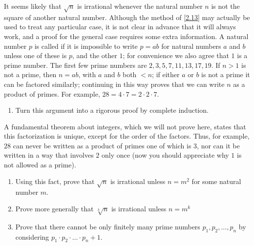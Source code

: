 \begin{pr}[*] \label{2.17} %
  It seems likely that $\sqrt{n}$ is irrational whenever
  the natural number $n$ is not the square of another
  natural number. Although the method of \autoref{2.13}
  may actually be used to treat any particular case, it is
  not clear in advance that it will always work, and a proof
  for the general case requires some extra information.
  A natural number $p$ is called  if
  it is impossible to write $p = ab$ for natural numbers
  $a$ and $b$ unless one of these is $p$, and the other $1$;
  for convenience we also agree that $1$ is 
  a prime number. The first few prime numbers are
  $2,3,5,7,11,13,17,19$. If $n > 1$ is not a prime, then
  $n = ab$, with $a$ and $b$ both $< n$; if either $a$ or
  $b$ is not a prime it can be factored similarly; continuing
  in this way proves that we can write $n$ as a product of
  primes. For example, $28 = 4 \cdot 7 = 2\cdot2\cdot7$.
  \begin{enumerate}[label=(\alph*)]
    \item \label{2.17:a}
    Turn this argument into a rigorous proof by
    complete induction.
  \end{enumerate}
  A fundamental theorem about integers, which we will not
  prove here, states that this factorization is unique,
  except for the order of the factors. Thus, for example,
  $28$ can never be written as a product of primes one of
  which is $3$, nor can it be written in a way that involves
  $2$ only once (now you should appreciate why $1$ is not
  allowed as a prime).
  \begin{enumerate}[label=(\alph*),resume]
    \item Using this fact, prove that $\sqrt{n}$ is irrational
    unless $n = m^2$ for some natural number $m$.
    \item Prove more generally that $\sqrt[k]{n}$ is irrational
    unless $n = m^k$
    \item Prove that there cannot be only finitely many
    prime numbers $p_1, p_2, \dots , p_n$ by considering
    $p_1\cdot p_2 \cdot \ldots \cdot p_n + 1$.
  \end{enumerate}
\end{pr}

